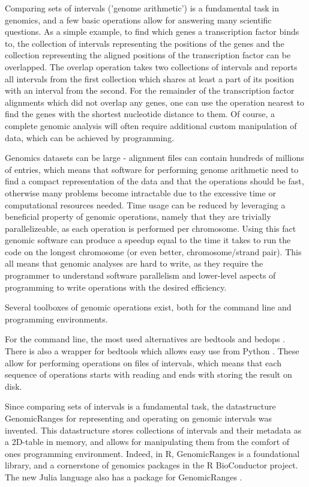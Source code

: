 \documentclass[10pt,letterpaper]{article}
\begin{document}
Comparing sets of intervals ('genome arithmetic') is a fundamental task in
genomics, and a few basic operations allow for answering many scientific
questions. As a simple example, to find which genes a transcription factor binds
to, the collection of intervals representing the positions of the genes and the
collection representing the aligned positions of the transcription factor can be
overlapped. The overlap operation takes two collections of intervals and reports
all intervals from the first collection which shares at least a part of its
position with an interval from the second. For the remainder of the
transcription factor alignments which did not overlap any genes, one can use the
operation nearest to find the genes with the shortest nucleotide
distance to them. Of course, a complete genomic analysis will often require
additional custom manipulation of data, which can be achieved by programming.

Genomics datasets can be large - alignment files can contain hundreds of
millions of entries, which means that software for performing genome arithmetic
need to find a compact representation of the data and that the operations should
be fast, otherwise many problems become intractable due to the excessive time or
computational resources needed. Time usage can be reduced by leveraging a
beneficial property of genomic operations, namely that they are trivially
parallelizeable, as each operation is performed per chromosome. Using this fact
genomic software can produce a speedup equal to the time it takes to run the
code on the longest chromosome (or even better, chromosome/strand pair). This
all means that genomic analyses are hard to write, as they require the
programmer to understand software parallelism and lower-level aspects of
programming to write operations with the desired efficiency.

Several toolboxes of genomic operations exist, both for the command line and
programming environments.

For the command line, the most used alternatives are bedtools
\cite{doi:10.1093/bioinformatics/btq033} and bedops
\cite{doi:10.1093/bioinformatics/bts277}. There is also a wrapper for bedtools
which allows easy use from Python \cite{doi:10.1093/bioinformatics/btr539}.
These allow for performing operations on files of intervals, which means that
each sequence of operations starts with reading and ends with storing the result
on disk.

Since comparing sets of intervals is a fundamental task, the datastructure
GenomicRanges\cite{10.1371/journal.pcbi.1003118} for representing and operating
on genomic intervals was invented. This datastructure stores collections of
intervals and their metadata as a 2D-table in memory, and allows for
manipulating them from the comfort of ones programming environment. Indeed, in
R, GenomicRanges is a foundational library, and a cornerstone of genomics
packages in the R BioConductor \cite{Gentleman2004} project. The new Julia
language \cite{doi:10.1137/141000671} also has a package for GenomicRanges
\cite{Haverty2017}.
\end{document}

